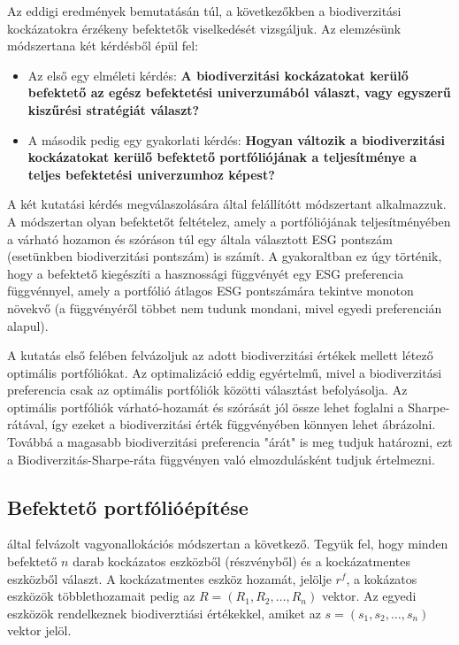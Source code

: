 Az eddigi eredmények bemutatásán túl, a következőkben a biodiverzitási kockázatokra érzékeny befektetők viselkedését vizsgáljuk. Az elemzésünk módszertana két kérdésből épül fel:
\begin{itemize}
    \item Az első egy elméleti kérdés: \textbf{A biodiverzitási kockázatokat kerülő befektető az egész befektetési univerzumából választ, vagy egyszerű kiszűrési stratégiát választ?}
    \item A második pedig egy gyakorlati kérdés: \textbf{Hogyan változik a biodiverzitási kockázatokat kerülő befektető portfóliójának a teljesítménye a teljes befektetési univerzumhoz képest?}
\end{itemize}


A két kutatási kérdés megválaszolására \textcite{pedersen_responsible_2021} által felállítótt módszertant alkalmazzuk. A módszertan olyan befektetőt feltételez, amely a portfóliójának teljesítményében a várható hozamon és szóráson túl egy általa választott ESG pontszám (esetünkben biodiverzitási pontszám) is számít. A gyakoraltban ez úgy történik, hogy a befektető kiegészíti a hasznossági függvényét egy ESG preferencia függvénnyel, amely a portfólió átlagos ESG pontszámára tekintve monoton növekvő (a függvényéről többet nem tudunk mondani, mivel egyedi preferencián alapul).

A kutatás első felében felvázoljuk az adott biodiverzitási értékek mellett létező optimális portfóliókat. Az optimalizáció eddig egyértelmű, mivel a biodiverzitási preferencia csak az optimális portfóliók közötti választást befolyásolja. Az optimális portfóliók várható-hozamát és szórását jól össze lehet foglalni a Sharpe-rátával, így ezeket a biodiverzitási érték függvényében könnyen lehet ábrázolni. Továbbá a magasabb biodiverzitási preferencia "árát" is meg tudjuk határozni, ezt a Biodiverzitás-Sharpe-ráta függvényen való elmozdulásként tudjuk értelmezni.

\subsection{Befektető portfólióépítése}

 \textcite{pedersen_responsible_2021} által felvázolt vagyonallokációs módszertan a következő. Tegyük fel, hogy minden befektető  $n$ darab kockázatos eszközből (részvényből) és a kockázatmentes eszközből választ. A kockázatmentes eszköz hozamát, jelölje $r^f$, a kokázatos eszközök többlethozamait pedig az $R = (R_1, R_2, \dots,R_n)$ vektor. Az egyedi eszközök rendelkeznek biodiverztiási értékekkel, amiket az $s=(s_1,s_2,\dots,s_n)$ vektor jelöl.

